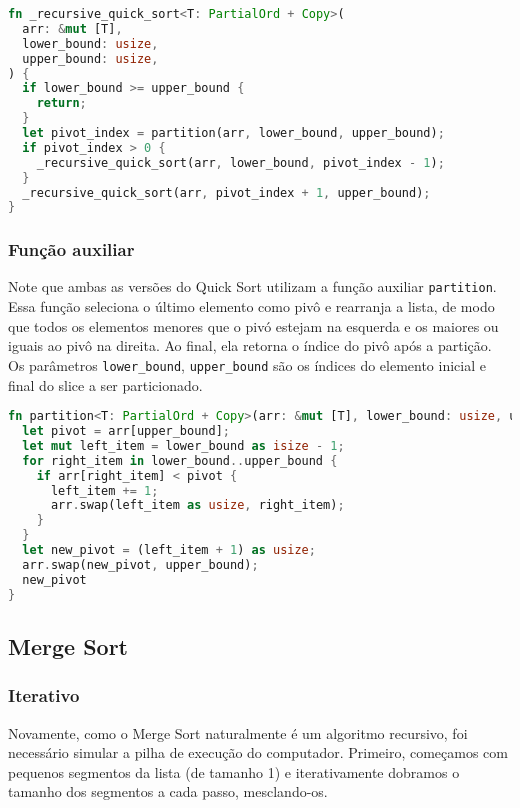 \newpage

\begin{lstlisting}[language=Rust, caption={Versão correta}]
fn _recursive_quick_sort<T: PartialOrd + Copy>(
  arr: &mut [T],
  lower_bound: usize,
  upper_bound: usize,
) {
  if lower_bound >= upper_bound {
    return;
  }
  let pivot_index = partition(arr, lower_bound, upper_bound);
  if pivot_index > 0 {
    _recursive_quick_sort(arr, lower_bound, pivot_index - 1);
  }
  _recursive_quick_sort(arr, pivot_index + 1, upper_bound);
}
\end{lstlisting}
\FloatBarrier

\subsubsection{Função auxiliar}

Note que ambas as versões do Quick Sort utilizam a função auxiliar \texttt{partition}. Essa função seleciona o último elemento como pivô e rearranja a lista, de modo que todos os elementos menores que o pivó estejam na esquerda e os maiores ou iguais ao pivô na direita. Ao final, ela retorna o índice do pivô após a partição.
Os parâmetros \texttt{lower\_bound}, \texttt{upper\_bound} são os índices do elemento inicial e final do slice a ser particionado.

\begin{lstlisting}[language=Rust]
fn partition<T: PartialOrd + Copy>(arr: &mut [T], lower_bound: usize, upper_bound: usize) -> usize {
  let pivot = arr[upper_bound];
  let mut left_item = lower_bound as isize - 1;
  for right_item in lower_bound..upper_bound {
    if arr[right_item] < pivot {
      left_item += 1;
      arr.swap(left_item as usize, right_item);
    }
  }
  let new_pivot = (left_item + 1) as usize;
  arr.swap(new_pivot, upper_bound);
  new_pivot
}
\end{lstlisting}
\FloatBarrier

\subsection{Merge Sort}

\subsubsection{Iterativo}

Novamente, como o Merge Sort naturalmente é um algoritmo recursivo, foi necessário simular a pilha de execução do computador. Primeiro, começamos com pequenos segmentos da lista (de tamanho 1) e iterativamente dobramos o tamanho dos segmentos a cada passo, mesclando-os.

